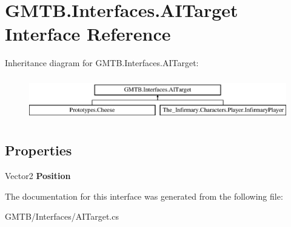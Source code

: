 \hypertarget{interface_g_m_t_b_1_1_interfaces_1_1_a_i_target}{}\section{G\+M\+T\+B.\+Interfaces.\+A\+I\+Target Interface Reference}
\label{interface_g_m_t_b_1_1_interfaces_1_1_a_i_target}
Inheritance diagram for G\+M\+T\+B.\+Interfaces.\+A\+I\+Target\+:\begin{figure}[H]
\begin{center}
\leavevmode
\includegraphics[height=1.885522cm]{interface_g_m_t_b_1_1_interfaces_1_1_a_i_target}
\end{center}
\end{figure}
\subsection*{Properties}
\begin{DoxyCompactItemize}
\item 
\mbox{\label{interface_g_m_t_b_1_1_interfaces_1_1_a_i_target_a7e87a8570ce347e07d10a8bfa90bd983}} 
Vector2 {\bfseries Position}
\end{DoxyCompactItemize}


The documentation for this interface was generated from the following file\+:\begin{DoxyCompactItemize}
\item 
G\+M\+T\+B/\+Interfaces/A\+I\+Target.\+cs\end{DoxyCompactItemize}
